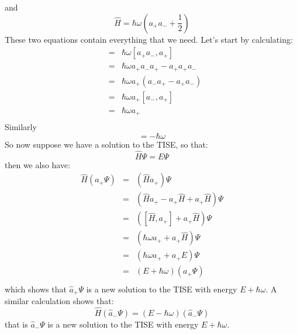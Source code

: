 \documentclass[12pt]{book}
\begin{document}
and
\begin{equation}
\label{eqn:ladder-ham}
\hat{H} =  \hbar\omega \left( a_+ a_- + \frac{1}{2} \right)
\end{equation}
These two equations contain everything that we need.  Let's start by calculating:
\begin{eqnarray*}
[H,a_+] &=& \hbar \omega [a_+ a_-, a_+]  \\
&=& \hbar \omega a_+ a_- a_+ - a_+ a_+ a_- \\
&=& \hbar \omega a_+ (a_- a_+ - a_+ a_-)\\
&=& \hbar \omega a_+ [a_-, a_+]\\
&=& \hbar \omega a_+  \\
\end{eqnarray*}
Similarly
\begin{equation*}
[H,a_-] = -\hbar \omega 
\end{equation*}
So now suppose we have a solution to the TISE, so that:
$$\hat{H} \Psi = E \Psi$$
then we also have:
\begin{eqnarray*}
\hat{H} \left( a_+ \Psi \right) &=& \left( \hat{H} a_+ \right) \Psi\\
                                &=& \left( \hat{H} a_+ - a_+ \hat{H} + a_+ \hat{H} \right) \Psi\\
                                &=& \left( [\hat{H}, a_+] + a_+ \hat{H} \right) \Psi\\
                                &=& \left( \hbar\omega a_+ + a_+ \hat{H} \right) \Psi\\
                                &=& \left( \hbar\omega a_+ + a_+ E \right) \Psi\\
                                &=& \left( E + \hbar\omega \right) (a_+ \Psi)\\
\end{eqnarray*}
which shows that $\hat{a}_+ \Psi$ is a new solution to the TISE with energy $E+\hbar\omega$.  A similar calculation shows that:
$$\hat{H} \left(\hat{a}_-\Psi\right) = \left( E - \hbar \omega \right) \left(\hat{a}_-\Psi\right)$$
that is $\hat{a}_- \Psi$ is a new solution to the TISE with energy $E+\hbar\omega$.
\end{document}
